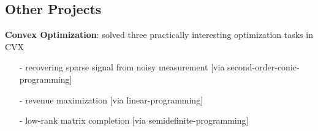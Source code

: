\documentclass[margin,line]{res}
\newenvironment{list2}{
  \begin{list}{$\bullet$}{%
      \setlength{\itemsep}{0in}
      \setlength{\parsep}{0in} \setlength{\parskip}{0in}
      \setlength{\topsep}{0in} \setlength{\partopsep}{0in}
      \setlength{\leftmargin}{0.2in}}}{\end{list}}
\begin{document}
\begin{resume}
\section{\sc Other Projects}
\textbf{Convex Optimization}: solved three practically interesting optimization tasks in CVX 
\begin{itemize}
    \item[-]recovering sparse signal from noisy measurement [via second-order-conic-programming]
    \item[-]revenue maximization [via linear-programming]
    \item[-]low-rank matrix completion [via semidefinite-programming]
\end{itemize}




\end{resume}
\end{document}
